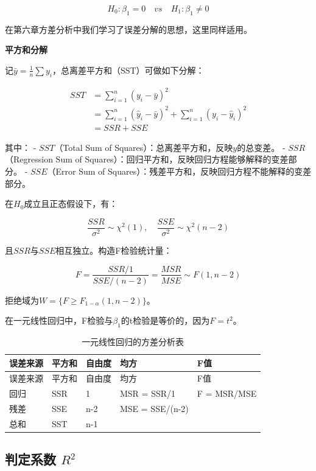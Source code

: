 \documentclass[
]{book}
\begin{document}
\[
H_0: \beta_1 = 0 \quad vs \quad H_1: \beta_1 \neq 0
\]

在第六章方差分析中我们学习了误差分解的思想，这里同样适用。

\textbf{平方和分解}

记\(\bar{y} = \frac{1}{n}\sum y_i\)，总离差平方和（SST）可做如下分解：

\[
\begin{aligned}
SST &= \sum_{i=1}^n (y_i - \bar{y})^2 \\
    &= \sum_{i=1}^n (\hat{y}_i - \bar{y})^2 + \sum_{i=1}^n (y_i - \hat{y}_i)^2 \\
    &= SSR + SSE
\end{aligned}
\]

其中：
- \(SST\)（Total Sum of Squares）：总离差平方和，反映\(y\)的总变差。
- \(SSR\)（Regression Sum of Squares）：回归平方和，反映回归方程能够解释的变差部分。
- \(SSE\)（Error Sum of Squares）：残差平方和，反映回归方程不能解释的变差部分。

在\(H_0\)成立且正态假设下，有：

\[
\frac{SSR}{\sigma^2} \sim \chi^2(1), \quad \frac{SSE}{\sigma^2} \sim \chi^2(n-2)
\]

且\(SSR\)与\(SSE\)相互独立。构造F检验统计量：

\[
F = \frac{SSR / 1}{SSE / (n-2)} = \frac{MSR}{MSE} \sim F(1, n-2)
\]

拒绝域为\(W = \{F \geq F_{1-\alpha}(1, n-2)\}\)。

在一元线性回归中，F检验与\(\beta_1\)的t检验是等价的，因为\(F = t^2\)。

\begin{longtable}[]{@{}lllll@{}}
\caption{一元线性回归的方差分析表}\tabularnewline
\toprule\noalign{}
误差来源 & 平方和 & 自由度 & 均方 & F值 \\
\midrule\noalign{}
\endfirsthead
\toprule\noalign{}
误差来源 & 平方和 & 自由度 & 均方 & F值 \\
\midrule\noalign{}
\endhead
\bottomrule\noalign{}
\endlastfoot
回归 & SSR & 1 & MSR = SSR/1 & F = MSR/MSE \\
残差 & SSE & n-2 & MSE = SSE/(n-2) & \\
总和 & SST & n-1 & & \\
\end{longtable}

\subsection{\texorpdfstring{判定系数 \(R^2\)}{判定系数 R\^{}2}}\label{ux5224ux5b9aux7cfbux6570-r2}
\end{document}
